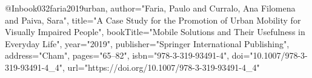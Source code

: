 @Inbook{032faria2019urban,
author="Faria, Paulo
and Curralo, Ana Filomena
and Paiva, Sara",
title="A Case Study for the Promotion of Urban Mobility for Visually Impaired People",
bookTitle="Mobile Solutions and Their Usefulness in Everyday Life",
year="2019",
publisher="Springer International Publishing",
address="Cham",
pages="65--82",
isbn="978-3-319-93491-4",
doi="10.1007/978-3-319-93491-4_4",
url="https://doi.org/10.1007/978-3-319-93491-4_4"
}